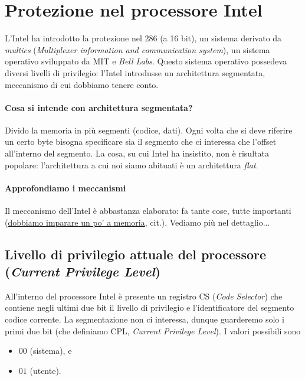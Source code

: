 \documentclass[11pt]{report}
\theoremstyle{definition}
\begin{document}
\section{Protezione nel processore Intel} L'Intel ha introdotto la protezione nel 286 (a 16 bit), un sistema derivato da \emph{multics} (\emph{Multiplexer information and communication system}), un sistema operativo sviluppato da MIT e \emph{Bell Labs}. Questo sistema operativo possedeva diversi livelli di privilegio: l'Intel introdusse un architettura segmentata, meccanismo di cui dobbiamo tenere conto.

\paragraph{Cosa si intende con architettura segmentata?} Divido la memoria in più segmenti (codice, dati). Ogni volta che si deve riferire un certo byte bisogna specificare sia il segmento che ci interessa che l'offset all'interno del segmento. La cosa, su cui Intel ha insistito, non è risultata popolare: l'architettura a cui noi siamo abituati è un architettura \emph{flat}.


\paragraph{Approfondiamo i meccanismi} Il meccanismo dell'Intel è abbastanza elaborato: fa tante cose, tutte importanti (\underline{dobbiamo imparare un po' a memoria}, cit.). Vediamo più nel dettaglio...
\subsection{Livello di privilegio attuale del processore (\emph{Current Privilege Level})} 
All'interno del processore Intel è presente un registro CS (\emph{Code Selector}) che contiene negli ultimi due bit il livello di privilegio e l'identificatore del segmento codice corrente. La segmentazione non ci interessa, dunque guarderemo solo i primi due bit (che definiamo CPL, \emph{Current Privilege Level}). I valori possibili sono 
\begin{multicols}{2}
\begin{itemize}
	\item $00$ (sistema), e
	\item  $01$ (utente).
\end{itemize}
\end{multicols}
\end{document}
